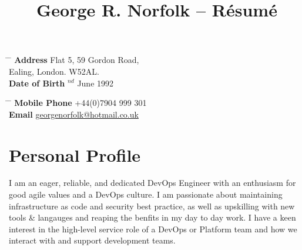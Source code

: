 \documentclass[10pt]{article} %
\begin{document}

\title{George R. Norfolk -- Résumé} %


\parbox{0.5\textwidth}{ %
\begin{tabbing} %
\hspace{3cm} \= \hspace{4cm} \= \kill %
{\bf Address} \> Flat 5, 59 Gordon Road,\\ %
\> Ealing, London. W52AL. \\ %
{\bf Date of Birth} $^{nd}$ June 1992 \\ %
\end{tabbing}}
\hfill %
\parbox{0.5\textwidth}{ %
\begin{tabbing} %
\hspace{3cm} \= \hspace{4cm} \= \kill %
{\bf Mobile Phone} \> +44(0)7904 999 301 \\ %
{\bf Email} \> \href{mailto:georgenorfolk@hotmail.co.uk}{georgenorfolk@hotmail.co.uk} \\ %
\end{tabbing}}


\section{Personal Profile}
\small
I am an eager, reliable, and dedicated DevOps Engineer with an enthusiasm for good agile values and a DevOps culture. I am passionate about maintaining infrastructure as code and security best practice, as well as upskilling with new tools \& langauges and reaping the benfits in my day to day work. I have a keen interest in the high-level service role of a DevOps or Platform team and how we interact with and support development teams.
\end{document}
